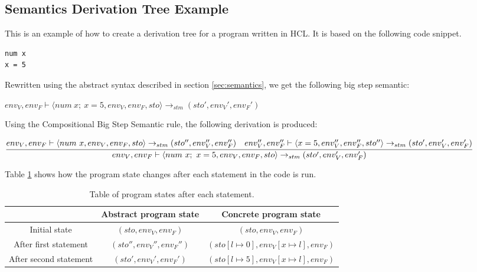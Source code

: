 \begin{landscape}
\section{Semantics Derivation Tree Example}
\label{sec:semanticsTree}
This is an example of how to create a derivation tree for a program written in HCL.
It is based on the following code snippet.

\begin{lstlisting}[language=HCL,label=lis:derivationCode,firstnumber=1]
num x
x = 5
\end{lstlisting}

Rewritten using the abstract syntax described in section \ref{sec:semantics}, we get the following big step semantic:

\begin{center}
	$env_V, env_F \vdash \langle num\ x;\ x = 5, env_V, env_F, sto \rangle \rightarrow_{stm} (sto', env_V', env_F')$
\end{center}
Using the Compositional Big Step Semantic rule, the following derivation is produced:

\begin{center}
	\begin{math}
		\cfrac
		{env_V, env_F \vdash \langle num\ x, env_V, env_F, sto \rangle \rightarrow_{stm} (sto'', env_V'', env_F'')\quad env_V'', env_F'' \vdash \langle x = 5, env_V'', env_F'', sto'' \rangle \rightarrow_{stm} (sto', env_V', env_F')}
		{env_V, env_F \vdash \langle num\ x;\ x = 5, env_V, env_F, sto \rangle \rightarrow_{stm} (sto', env_V', env_F')}
	\end{math}
\end{center}

Table \ref{tbl:progstates} shows how the program state changes after each statement in the code is run.

\begin{table}[H]
	\centering
	\caption{Table of program states after each statement.}
	\label{tbl:progstates}
	\setlength\extrarowheight{5pt}
	\begin{tabular}{|c|c|c|}
		\hline
		& Abstract program state      & Concrete program state                          \\ \hline
		Initial state          & $(sto, env_V, env_F)$       & $(sto, env_V, env_F)$                           \\ \hline
		After first statement  & $(sto'', env_V'', env_F'')$ & $(sto[l \mapsto 0], env_V[x \mapsto l], env_F)$ \\ \hline
		After second statement & $(sto', env_V', env_F')$    & $(sto[l \mapsto 5], env_V[x \mapsto l], env_F)$  \\ \hline
	\end{tabular}
\end{table}

\end{landscape}
